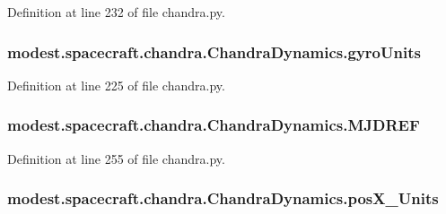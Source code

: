 Definition at line 232 of file chandra.\+py.

\subsubsection[{\texorpdfstring{gyro\+Units}{gyroUnits}}]{\setlength{\rightskip}{0pt plus 5cm}modest.\+spacecraft.\+chandra.\+Chandra\+Dynamics.\+gyro\+Units}\hypertarget{classmodest_1_1spacecraft_1_1chandra_1_1ChandraDynamics_a14d24cfa07599c0d0a5011bc961ff7f3}{}\label{classmodest_1_1spacecraft_1_1chandra_1_1ChandraDynamics_a14d24cfa07599c0d0a5011bc961ff7f3}


Definition at line 225 of file chandra.\+py.

\subsubsection[{\texorpdfstring{M\+J\+D\+R\+EF}{MJDREF}}]{\setlength{\rightskip}{0pt plus 5cm}modest.\+spacecraft.\+chandra.\+Chandra\+Dynamics.\+M\+J\+D\+R\+EF}\hypertarget{classmodest_1_1spacecraft_1_1chandra_1_1ChandraDynamics_ab8fa1f9badeff4d0923badaeded814ab}{}\label{classmodest_1_1spacecraft_1_1chandra_1_1ChandraDynamics_ab8fa1f9badeff4d0923badaeded814ab}


Definition at line 255 of file chandra.\+py.

\subsubsection[{\texorpdfstring{pos\+X\+\_\+\+Units}{posX_Units}}]{\setlength{\rightskip}{0pt plus 5cm}modest.\+spacecraft.\+chandra.\+Chandra\+Dynamics.\+pos\+X\+\_\+\+Units}\hypertarget{classmodest_1_1spacecraft_1_1chandra_1_1ChandraDynamics_a108e84849b631086fb2de9f97c6efd06}{}\label{classmodest_1_1spacecraft_1_1chandra_1_1ChandraDynamics_a108e84849b631086fb2de9f97c6efd06}


